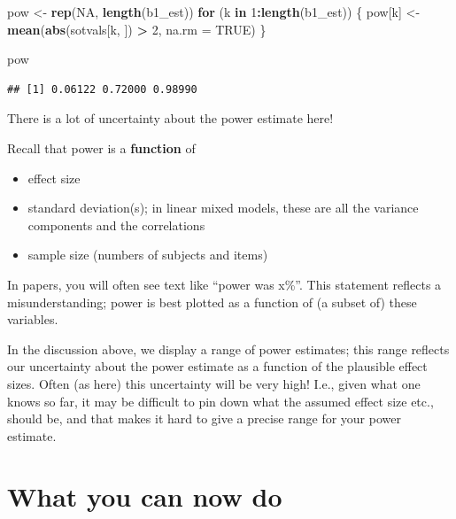 \documentclass[12pt,]{krantz}
\newenvironment{Shaded}{\begin{snugshade}}{\end{snugshade}}
\newcommand{\ControlFlowTok}[1]{\textcolor[rgb]{0.13,0.29,0.53}{\textbf{#1}}}
\newcommand{\DataTypeTok}[1]{\textcolor[rgb]{0.13,0.29,0.53}{#1}}
\newcommand{\DecValTok}[1]{\textcolor[rgb]{0.00,0.00,0.81}{#1}}
\newcommand{\KeywordTok}[1]{\textcolor[rgb]{0.13,0.29,0.53}{\textbf{#1}}}
\newcommand{\NormalTok}[1]{#1}
\newcommand{\OperatorTok}[1]{\textcolor[rgb]{0.81,0.36,0.00}{\textbf{#1}}}
\newcommand{\OtherTok}[1]{\textcolor[rgb]{0.56,0.35,0.01}{#1}}
\newcommand{\StringTok}[1]{\textcolor[rgb]{0.31,0.60,0.02}{#1}}
\providecommand{\tightlist}{%
  \setlength{\itemsep}{0pt}\setlength{\parskip}{0pt}}
\begin{document}
\begin{Shaded}
\begin{Highlighting}[]
\NormalTok{pow <-}\StringTok{ }\KeywordTok{rep}\NormalTok{(}\OtherTok{NA}\NormalTok{, }\KeywordTok{length}\NormalTok{(b1_est))}
\ControlFlowTok{for}\NormalTok{ (k }\ControlFlowTok{in} \DecValTok{1}\OperatorTok{:}\KeywordTok{length}\NormalTok{(b1_est)) \{}
\NormalTok{  pow[k] <-}\StringTok{ }\KeywordTok{mean}\NormalTok{(}\KeywordTok{abs}\NormalTok{(sotvals[k, ]) }\OperatorTok{>}\StringTok{ }\DecValTok{2}\NormalTok{, }
    \DataTypeTok{na.rm =} \OtherTok{TRUE}\NormalTok{)}
\NormalTok{\}}

\NormalTok{pow}
\end{Highlighting}
\end{Shaded}

\begin{verbatim}
## [1] 0.06122 0.72000 0.98990
\end{verbatim}

There is a lot of uncertainty about the power estimate here!

Recall that power is a \textbf{function} of

\begin{itemize}
\tightlist
\item
  effect size
\item
  standard deviation(s); in linear mixed models, these are all the variance components and the correlations
\item
  sample size (numbers of subjects and items)
\end{itemize}

In papers, you will often see text like ``power was x\%''. This statement reflects a misunderstanding; power is best plotted as a function of (a subset of) these variables.

In the discussion above, we display a range of power estimates; this range reflects our uncertainty about the power estimate as a function of the plausible effect sizes. Often (as here) this uncertainty will be very high! I.e., given what one knows so far, it may be difficult to pin down what the assumed effect size etc., should be, and that makes it hard to give a precise range for your power estimate.

\hypertarget{what-you-can-now-do}{%
\section{What you can now do}\label{what-you-can-now-do}}
\end{document}
